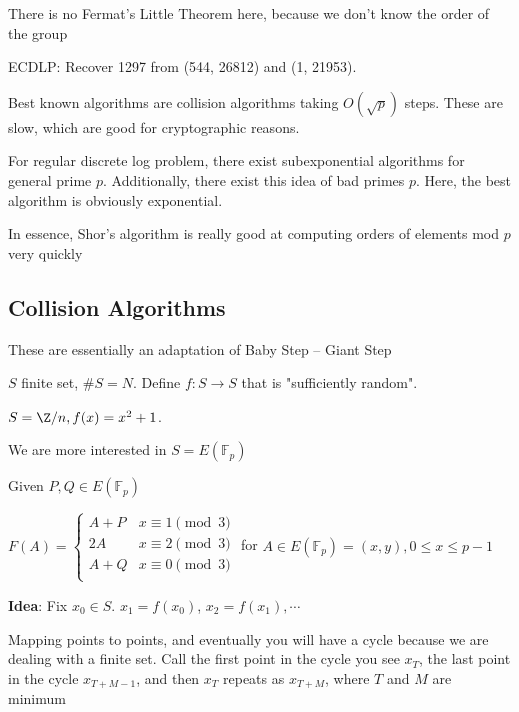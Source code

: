 \documentclass[twoside, 10pt]{article}
\newcommand{\F}{\mathbb{F}}
\begin{document}
\begin{rmk}
    There is no Fermat's Little Theorem here, because we don't know the order of the group
\end{rmk}

ECDLP: Recover 1297 from (544, 26812) and (1, 21953).

Best known algorithms are collision algorithms taking $O(\sqrt{p})$ steps. These are slow, which are good for cryptographic reasons.

\begin{rmk}
    For regular discrete log problem, there exist subexponential algorithms for general prime $p$. Additionally, there exist this idea of bad primes $p$. Here, the best algorithm is obviously exponential.
\end{rmk}

\begin{rmk}
    In essence, Shor's algorithm is really good at computing orders of elements mod $p$ very quickly
\end{rmk}

\subsection{Collision Algorithms} These are essentially an adaptation of Baby Step -- Giant Step

$S$ finite set, $\#S = N$. Define $f : S \to S$ that is "sufficiently random".

\begin{exm*}
    $S  = \Z/n, f(x) = x^2 + 1$.
\end{exm*}

We are more interested in $S = E(\F_p)$

Given $P, Q \in E(\F_p)$

$F(A) = \begin{cases}
    A + P & x \equiv 1\pmod{3}\\
    2A & x \equiv 2\pmod{3}\\
    A + Q & x \equiv 0\pmod{3}\\
\end{cases}$ \hspace{1em} for $A \in E(\F_p) = (x, y), 0 \leq x \leq p-1$

\textbf{Idea}: Fix $x_0 \in S$. $x_1 = f(x_0)$, $x_2 = f(x_1), \cdots$

Mapping points to points, and eventually you will have a cycle because we are dealing with a finite set. Call the first point in the cycle you see $x_T$, the last point in the cycle $x_{T + M - 1}$, and then $x_T$ repeats as $x_{T + M}$, where $T$ and $M$ are minimum
\end{document}
